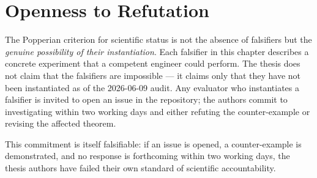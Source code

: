 \section{Openness to Refutation}
\label{sec:openness-refutation}

The Popperian criterion for scientific status is not the absence of falsifiers but the
\emph{genuine possibility of their instantiation}. Each falsifier in this chapter
describes a concrete experiment that a competent engineer could perform. The thesis
does not claim that the falsifiers are impossible — it claims only that they have not
been instantiated as of the 2026-06-09 audit. Any evaluator who instantiates a
falsifier is invited to open an issue in the \wasm{} repository; the authors commit to
investigating within two working days and either refuting the counter-example or
revising the affected theorem.

This commitment is itself falsifiable: if an issue is opened, a counter-example is
demonstrated, and no response is forthcoming within two working days, the thesis
authors have failed their own standard of scientific accountability.
